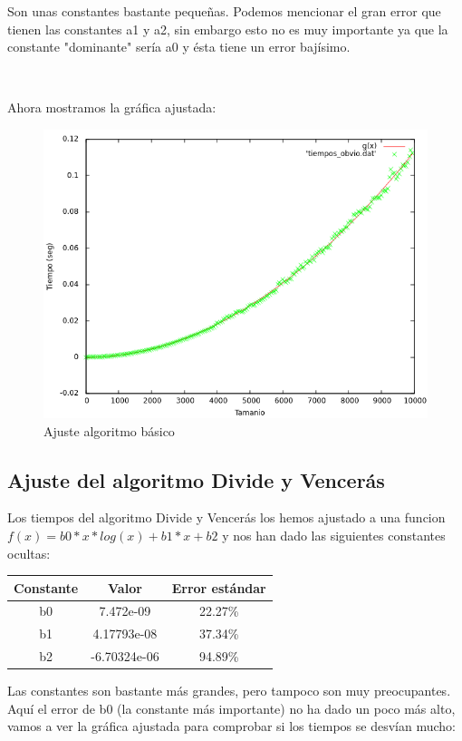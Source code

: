 \documentclass{article}
\begin{document}
	Son unas constantes bastante pequeñas. Podemos mencionar el gran error que tienen las constantes a1 y a2, sin embargo esto no es muy importante ya que la constante "dominante" sería a0 y ésta tiene un error bajísimo.
	
	\
	
	Ahora mostramos la gráfica ajustada:
	
	\begin{figure}[H]
		\centering
		\includegraphics[totalheight=8cm]{img/Basico_ajustada}
		\caption{Ajuste algoritmo básico}
		\label{fig:Basico_ajustada}
	\end{figure}
	
	\subsection{Ajuste del algoritmo Divide y Vencerás}
	Los tiempos del algoritmo Divide y Vencerás los hemos ajustado a una funcion $f(x)=b0*x*log(x)+b1*x+b2$ y nos han dado las siguientes constantes ocultas:
	
	\begin{longtable}{|c|c|c|}
		\hline
		Constante		& Valor			& Error estándar	\\ \hline
		b0              & 7.472e-09		& 22.27\%	 \\ \hline
		b1              & 4.17793e-08 	& 37.34\%	 \\ \hline
		b2              & -6.70324e-06	& 94.89\%	 \\ \hline
	\end{longtable}

	Las constantes son bastante más grandes, pero tampoco son muy preocupantes. Aquí el error de b0 (la constante más importante) no ha dado un poco más alto, vamos a ver la gráfica ajustada para comprobar si los tiempos se desvían mucho:
	
\end{document}
